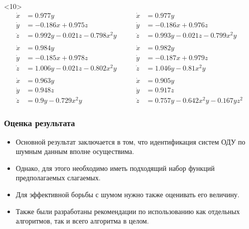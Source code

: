 \documentclass[pdf, hyperref={unicode}, aspectratio=169]{beamer}
\begin{document}
\begin{frame}
\begin{onlyenv}<10>
\small
\begin{equation*}
\begin{aligned}
\dot{x} &= 0.977 y                         &\dot{x} &= 0.977 y \\
\dot{y} &= -0.186 x + 0.975 z              &\dot{y} &= -0.186 x + 0.976 z \\
\dot{z} &= 0.992 y - 0.021 z - 0.798 x^2 y \qquad &\dot{z} &= 0.993 y - 0.021 z - 0.799 x^2 y \\
\\
\dot{x} &= 0.984 y                         &\dot{x} &= 0.982 y \\
\dot{y} &= -0.185 x + 0.978 z              &\dot{y} &= -0.187 x + 0.979 z \\
\dot{z} &= 1.006 y - 0.021 z - 0.802 x^2 y &\dot{z} &= 1.046 y - 0.81 x^2 y \\
\\
\dot{x} &= 0.963 y             &\dot{x} &= 0.905 y \\
\dot{y} &= 0.948 z             &\dot{y} &= 0.917 z \\
\dot{z} &= 0.9 y - 0.729 x^2 y &\dot{z} &= 0.757 y - 0.642 x^2 y - 0.167 y z^2
\end{aligned}
\end{equation*}
\end{onlyenv}
\end{frame}


\begin{frame}
\frametitle{Оценка результата}

\begin{itemize}
\item Основной результат заключается в том, что идентификация систем ОДУ по шумным данным вполне осуществима.
\item Однако, для этого необходимо иметь подходящий набор функций предполагаемых слагаемых.
\item Для эффективной борьбы с шумом нужно также оценивать его величину.
\item Также были разработаны рекомендации по использованию как отдельных алгоритмов, так и всего алгоритма в целом.
\end{itemize}
\end{frame}
\end{document}
